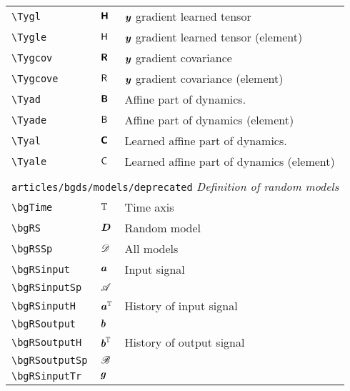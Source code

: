 \begin{longtable}{lll}
 {\color[rgb]{0.5,0.5,0.5}\texttt{\textbackslash Tygl}} & $\boldsymbol{{\mathsf{H}}}$ &  $\boldsymbol{y}$ gradient learned tensor \\ 
 {\color[rgb]{0.5,0.5,0.5}\texttt{\textbackslash Tygle}} & ${\mathsf{H}}$ &  $\boldsymbol{y}$ gradient learned tensor (element)\\ 
 {\color[rgb]{0.5,0.5,0.5}\texttt{\textbackslash Tygcov}} & $\boldsymbol{{\mathsf{R}}}$ &  $\boldsymbol{y}$ gradient covariance\\ 
 {\color[rgb]{0.5,0.5,0.5}\texttt{\textbackslash Tygcove}} & ${\mathsf{R}}$ &  $\boldsymbol{y}$ gradient covariance (element)\\ 
 {\color[rgb]{0.5,0.5,0.5}\texttt{\textbackslash Tyad}} & $\boldsymbol{{\mathsf{B}}}$ &  Affine part of dynamics.\\ 
 {\color[rgb]{0.5,0.5,0.5}\texttt{\textbackslash Tyade}} & ${\mathsf{B}}$ &  Affine part of dynamics (element)\\ 
 {\color[rgb]{0.5,0.5,0.5}\texttt{\textbackslash Tyal}} & $\boldsymbol{{\mathsf{C}}}$ &  Learned affine part of dynamics.\\ 
 {\color[rgb]{0.5,0.5,0.5}\texttt{\textbackslash Tyale}} & ${\mathsf{C}}$ &  Learned affine part of dynamics (element)\\ 
  &  & \\ 
 \multicolumn{3}{l}{{\color[rgb]{0.5,0.5,0.5}\texttt{articles/bgds/models/deprecated}} \emph{Definition of random models}}\\ 
 \hline
{\color[rgb]{0.5,0.5,0.5}\texttt{\textbackslash bgTime}} & $\mathbb{T}$ &  Time axis\\ 
 {\color[rgb]{0.5,0.5,0.5}\texttt{\textbackslash bgRS}} & $\boldsymbol{D}$ &  Random model\\ 
 {\color[rgb]{0.5,0.5,0.5}\texttt{\textbackslash bgRSSp}} & $\mathscr{D}$ &  All models\\ 
 {\color[rgb]{0.5,0.5,0.5}\texttt{\textbackslash bgRSinput}} & $\boldsymbol{a}$ &  Input signal\\ 
 {\color[rgb]{0.5,0.5,0.5}\texttt{\textbackslash bgRSinputSp}} & $\mathscr{A}$ &  \\ 
 {\color[rgb]{0.5,0.5,0.5}\texttt{\textbackslash bgRSinputH}} & $\boldsymbol{a}^{\mathbb{T}}$ &  History of input signal\\ 
 {\color[rgb]{0.5,0.5,0.5}\texttt{\textbackslash bgRSoutput}} & $\boldsymbol{b}$ & \\ 
 {\color[rgb]{0.5,0.5,0.5}\texttt{\textbackslash bgRSoutputH}} & $\boldsymbol{b}^{\mathbb{T}}$ &  History of output signal\\ 
 {\color[rgb]{0.5,0.5,0.5}\texttt{\textbackslash bgRSoutputSp}} & $\mathscr{B}$ &  \\ 
 {\color[rgb]{0.5,0.5,0.5}\texttt{\textbackslash bgRSinputTr}} & $\boldsymbol{g}$ &  \\ 

\end{longtable}
